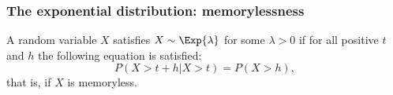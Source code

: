 \documentclass[9pt]{beamer}
\begin{document}
\begin{frame}
\frametitle{The exponential distribution: memorylessness}

\begin{theorem}
A random variable $X$ satisfies $X \sim \Exp{\lambda}$ for some $\lambda > 0$ if for all positive $t$ and $h$ the following equation is satisfied:
\begin{equation*}
P(X > t + h | X > t) = P(X > h),
\end{equation*}
that is, if $X$ is memoryless.
\end{theorem}



\end{frame}
\end{document}
